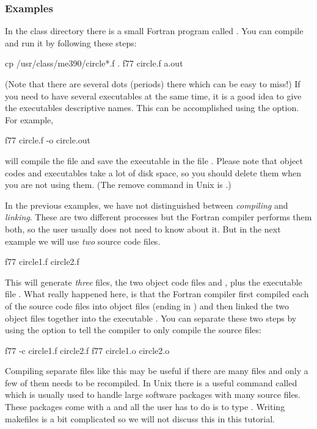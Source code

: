 \subsubsection*{Examples}

In the class directory there is a small Fortran program called
. You can compile and run it by following these
steps:

\begin{code}
    cp /usr/class/me390/circle*.f .
    f77 circle.f
    a.out
\end{code}

(Note that there are several dots (periods) there which can be easy to
miss!) If you need to have several executables at the same time, it is a
good idea to give the executables descriptive names. This can be
accomplished using the  option. For example,

\begin{code}
    f77 circle.f -o circle.out
\end{code}

will compile the file  and save the executable in
the file . Please note that object codes and
executables take a lot of disk space, so you should delete them when you
are not using them. (The remove command in Unix is .)

In the previous examples, we have not distinguished between
\textit{compiling} and \textit{linking}. These are two different
processes but the Fortran compiler performs them both, so the user
usually does not need to know about it. But in the next example we will
use \textit{two} source code files.

\begin{code}
    f77 circle1.f circle2.f
\end{code}

This will generate \textit{three} files, the two object code files
 and , plus the executable
file . What really happened here, is that the Fortran
compiler first compiled each of the source code files into object files
(ending in ) and then linked the two object files
together into the executable . You can separate these
two steps by using the  option to tell the compiler to
only compile the source files:

\begin{code}
    f77 -c circle1.f circle2.f
    f77 circle1.o circle2.o
\end{code}

Compiling separate files like this may be useful if there are many files
and only a few of them needs to be recompiled. In Unix there is a useful
command called  which is usually used to handle large
software packages with many source files. These packages come with a
 and all the user has to do is to type
. Writing makefiles is a bit complicated so we will not
discuss this in this tutorial.

\footer
